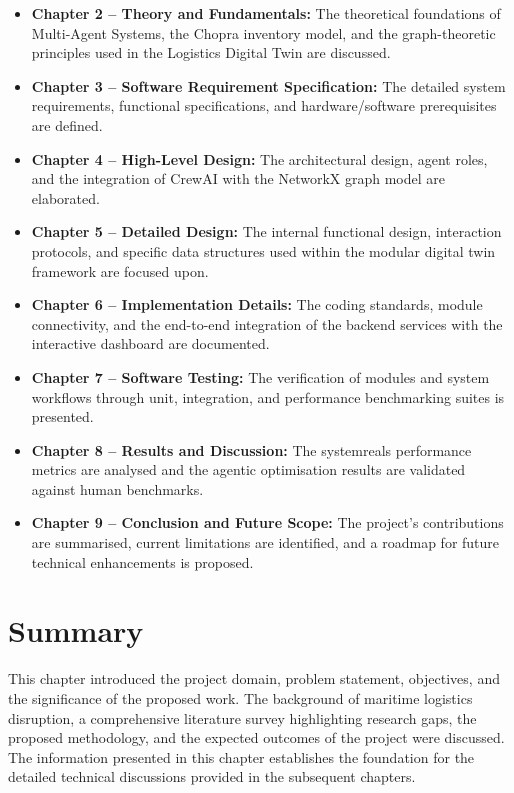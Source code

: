 \begin{itemize}
    \item \textbf{Chapter 2 -- Theory and Fundamentals:} The theoretical foundations of Multi-Agent Systems, the Chopra inventory model, and the graph-theoretic principles used in the Logistics Digital Twin are discussed.
    \item \textbf{Chapter 3 -- Software Requirement Specification:} The detailed system requirements, functional specifications, and hardware/software prerequisites are defined.
    \item \textbf{Chapter 4 -- High-Level Design:} The architectural design, agent roles, and the integration of CrewAI with the NetworkX graph model are elaborated.
    \item \textbf{Chapter 5 -- Detailed Design:} The internal functional design, interaction protocols, and specific data structures used within the modular digital twin framework are focused upon.
    \item \textbf{Chapter 6 -- Implementation Details:} The coding standards, module connectivity, and the end-to-end integration of the backend services with the interactive dashboard are documented.
    \item \textbf{Chapter 7 -- Software Testing:} The verification of modules and system workflows through unit, integration, and performance benchmarking suites is presented.
    \item \textbf{Chapter 8 -- Results and Discussion:} The systemreals performance metrics are analysed and the agentic optimisation results are validated against human benchmarks.
    \item \textbf{Chapter 9 -- Conclusion and Future Scope:} The project's contributions are summarised, current limitations are identified, and a roadmap for future technical enhancements is proposed.
\end{itemize}

\section[Summary]{\textbf{Summary}}
This chapter introduced the project domain, problem statement, objectives, and the significance of the proposed work. The background of maritime logistics disruption, a comprehensive literature survey highlighting research gaps, the proposed methodology, and the expected outcomes of the project were discussed. The information presented in this chapter establishes the foundation for the detailed technical discussions provided in the subsequent chapters.
